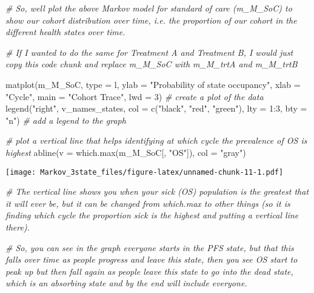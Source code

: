 \documentclass[
]{article}
\newenvironment{Shaded}{\begin{snugshade}}{\end{snugshade}}
\newcommand{\AttributeTok}[1]{\textcolor[rgb]{0.77,0.63,0.00}{#1}}
\newcommand{\CommentTok}[1]{\textcolor[rgb]{0.56,0.35,0.01}{\textit{#1}}}
\newcommand{\DecValTok}[1]{\textcolor[rgb]{0.00,0.00,0.81}{#1}}
\newcommand{\FunctionTok}[1]{\textcolor[rgb]{0.00,0.00,0.00}{#1}}
\newcommand{\NormalTok}[1]{#1}
\newcommand{\SpecialCharTok}[1]{\textcolor[rgb]{0.00,0.00,0.00}{#1}}
\newcommand{\StringTok}[1]{\textcolor[rgb]{0.31,0.60,0.02}{#1}}
\begin{document}
\begin{Shaded}
\begin{Highlighting}[]
\CommentTok{\# So, we\textquotesingle{}ll plot the above Markov model for standard of care (m\_M\_SoC) to show our cohort distribution over time, i.e. the proportion of our cohort in the different health states over time.}

\CommentTok{\# If I wanted to do the same for Treatment A and Treatment B, I would just copy this code chunk and replace m\_M\_SoC with m\_M\_trtA and m\_M\_trtB}

\FunctionTok{matplot}\NormalTok{(m\_M\_SoC, }\AttributeTok{type =} \StringTok{\textquotesingle{}l\textquotesingle{}}\NormalTok{, }
        \AttributeTok{ylab =} \StringTok{"Probability of state occupancy"}\NormalTok{,}
        \AttributeTok{xlab =} \StringTok{"Cycle"}\NormalTok{,}
        \AttributeTok{main =} \StringTok{"Cohort Trace"}\NormalTok{, }\AttributeTok{lwd =} \DecValTok{3}\NormalTok{)  }\CommentTok{\# create a plot of the data}
\FunctionTok{legend}\NormalTok{(}\StringTok{"right"}\NormalTok{, v\_names\_states, }\AttributeTok{col =} \FunctionTok{c}\NormalTok{(}\StringTok{"black"}\NormalTok{, }\StringTok{"red"}\NormalTok{, }\StringTok{"green"}\NormalTok{), }
       \AttributeTok{lty =} \DecValTok{1}\SpecialCharTok{:}\DecValTok{3}\NormalTok{, }\AttributeTok{bty =} \StringTok{"n"}\NormalTok{)  }\CommentTok{\# add a legend to the graph}

\CommentTok{\# plot a vertical line that helps identifying at which cycle the prevalence of OS is highest}
\FunctionTok{abline}\NormalTok{(}\AttributeTok{v =} \FunctionTok{which.max}\NormalTok{(m\_M\_SoC[, }\StringTok{"OS"}\NormalTok{]), }\AttributeTok{col =} \StringTok{"gray"}\NormalTok{)}
\end{Highlighting}
\end{Shaded}

\texttt{[image: Markov\_3state\_files/figure-latex/unnamed-chunk-11-1.pdf]}

\begin{Shaded}
\begin{Highlighting}[]
\CommentTok{\# The vertical line shows you when your sick (OS) population is the greatest that it will ever be, but it can be changed from which.max to other things (so it is finding which cycle the proportion sick is the highest and putting a vertical line there).}



\CommentTok{\# So, you can see in the graph everyone starts in the PFS state, but that this falls over time as people progress and leave this state, then you see OS start to peak up but then fall again as people leave this state to go into the dead state, which is an absorbing state and by the end will include everyone.}
\end{Highlighting}
\end{Shaded}
\end{document}
